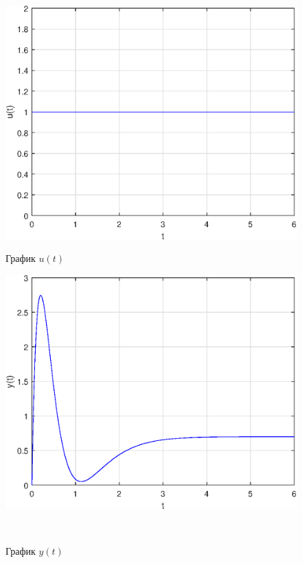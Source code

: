 \documentclass[a4paper]{article}
\begin{document}
\begin{figure}[H]
    \begin{minipage}{0.5\textwidth}
        \centering \includegraphics[width=\textwidth]{ex1/u.eps}
        \caption{График $u(t)$}
    \end{minipage}\hfill
    \begin{minipage}{0.5\textwidth}
        \centering \includegraphics[width=\textwidth]{ex1/y.eps}
        \caption{График $y(t)$}
    \end{minipage}\\[1em]
\end{figure}\noindent\
\end{document}
